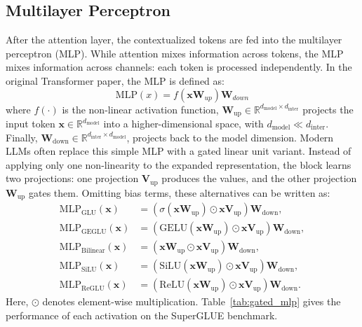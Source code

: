 \subsection{Multilayer Perceptron}
After the attention layer, the contextualized tokens are fed into the multilayer perceptron (MLP). While attention mixes information across tokens, the MLP mixes information across channels: each token is processed independently. In the original Transformer paper, the MLP is defined as:
$$
\text{MLP}(x) = f(\textbf{x}\textbf{W}_{up})\textbf{W}_{down}
$$
where $f(\cdot)$ is the non-linear activation function, 
$\textbf{W}_{\text{up}} \in \mathbb{R}^{d_{\text{model}} \times d_{\text{inter}}}$ 
projects the input token $\mathbf{x} \in \mathbb{R}^{d_{\text{model}}}$ into a higher-dimensional space,
with $d_{\text{model}} \ll d_{\text{inter}}$. Finally, $\textbf{W}_{\text{down}} \in \mathbb{R}^{d_{\text{inter}} \times d_{\text{model}}}$,
projects back to the model dimension.
Modern LLMs often replace this simple MLP with a gated linear unit variant. Instead of applying
only one non-linearity to the expanded representation, the block learns two projections: one
projection $\mathbf{V}_{\text{up}}$ produces the values, and the other projection
$\mathbf{W}_{\text{up}}$ gates them. Omitting bias terms, these alternatives can be written as:
\begin{align}
    \mathrm{MLP}_{\mathrm{GLU}}(\mathbf{x})
    &= \left(\sigma(\mathbf{x}\mathbf{W}_{\text{up}}) \odot \mathbf{x}\mathbf{V}_{\text{up}}\right)\mathbf{W}_{\text{down}}, \\
    \mathrm{MLP}_{\mathrm{GEGLU}}(\mathbf{x})
    &= \left(\mathrm{GELU}(\mathbf{x}\mathbf{W}_{\text{up}}) \odot \mathbf{x}\mathbf{V}_{\text{up}}\right)\mathbf{W}_{\text{down}}, \\
    \mathrm{MLP}_{\mathrm{Bilinear}}(\mathbf{x})
    &= \left(\mathbf{x}\mathbf{W}_{\text{up}} \odot \mathbf{x}\mathbf{V}_{\text{up}}\right)\mathbf{W}_{\text{down}}, \\
    \mathrm{MLP}_{\mathrm{SiLU}}(\mathbf{x})
    &= \left(\mathrm{SiLU}(\mathbf{x}\mathbf{W}_{\text{up}}) \odot \mathbf{x}\mathbf{V}_{\text{up}}\right)\mathbf{W}_{\text{down}}, \\
    \mathrm{MLP}_{\mathrm{ReGLU}}(\mathbf{x})
    &= \left(\mathrm{ReLU}(\mathbf{x}\mathbf{W}_{\text{up}}) \odot \mathbf{x}\mathbf{V}_{\text{up}}\right)\mathbf{W}_{\text{down}}.
\end{align}
Here, $\odot$ denotes element-wise multiplication. Table~\ref{tab:gated_mlp} gives the performance of each activation on the SuperGLUE benchmark.
